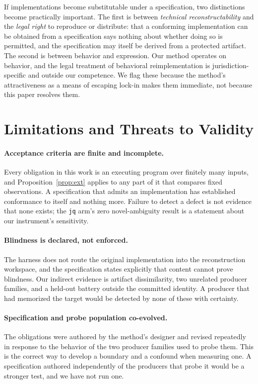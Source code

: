 \documentclass[10pt,twocolumn]{article}
\begin{document}
If implementations become substitutable under a specification, two
distinctions become practically important. The first is between
\emph{technical reconstructability} and the \emph{legal right} to
reproduce or distribute: that a conforming implementation can be
obtained from a specification says nothing about whether doing so is
permitted, and the specification may itself be derived from a protected
artifact. The second is between behavior and expression. Our method
operates on behavior, and the legal treatment of behavioral
reimplementation is jurisdiction-specific and outside our competence. We
flag these because the method's attractiveness as a means of escaping
lock-in makes them immediate, not because this paper resolves them.

\section{Limitations and Threats to Validity}
\label{sec:threats}

\paragraph{Acceptance criteria are finite and incomplete.} Every
obligation in this work is an executing program over finitely many
inputs, and Proposition~\ref{prop:ext} applies to any part of it that
compares fixed observations. A specification that admits an
implementation has established conformance to itself and nothing more.
Failure to detect a defect is not evidence that none exists; the
\texttt{jq} arm's zero novel-ambiguity result is a statement about our
instrument's sensitivity.

\paragraph{Blindness is declared, not enforced.} The harness does not
route the original implementation into the reconstruction workspace, and
the specification states explicitly that content cannot prove blindness.
Our indirect evidence is artifact dissimilarity, two unrelated producer
families, and a held-out battery outside the committed identity. A
producer that had memorized the target would be detected by none of
these with certainty.

\paragraph{Specification and probe population co-evolved.} The
obligations were authored by the method's designer and revised
repeatedly in response to the behavior of the two producer families used
to probe them. This is the correct way to develop a boundary and a
confound when measuring one. A specification authored independently of
the producers that probe it would be a stronger test, and we have not run
one.
\end{document}
